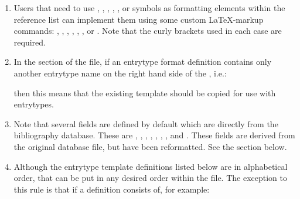 \documentclass[letterpaper,10pt,english]{sphinxmanual}
\begin{document}
\begin{enumerate}
\item {} 
Users that need to use \sphinxcode{\sphinxupquote{{[}}}, \sphinxcode{\sphinxupquote{{]}}}, \sphinxcode{\sphinxupquote{\#}}, \sphinxcode{\sphinxupquote{\textless{}}}, \sphinxcode{\sphinxupquote{\textgreater{}}}, or \sphinxcode{\sphinxupquote{\textbar{}}} symbols as formatting elements within the reference list can implement them using some custom LaTeX-markup commands: , , , , , , or . Note that the curly brackets used in each case are required.

\item {} 
In the  section of the file, if an entrytype format definition contains only another entrytype name on the right hand side of the \sphinxcode{\sphinxupquote{=}}, i.e.:

%
\begin{sphinxVerbatim}[commandchars=\\\{\}]
  
\end{sphinxVerbatim}

then this means that the existing  template should be copied for use with  entrytypes.

\item {} 
Note that several fields are defined by default which are  directly from the bibliography database. These are , , , , , , , and . These fields are derived from the original database file, but have been reformatted. See the  section below.

\item {} 
Although the entrytype template definitions listed below are in alphabetical order, that can be put in any desired order within the file. The exception to this rule is that if a definition consists of, for example:


\end{enumerate}
\end{document}

